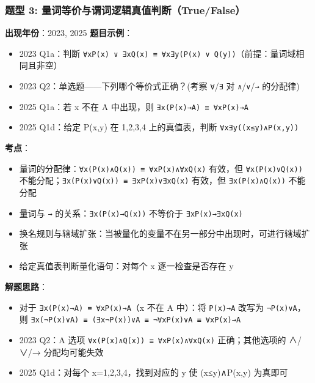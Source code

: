 \documentclass[10pt,a4paper,openany]{ctexbook}
\theoremstyle{definition}
\theoremstyle{remark}
\begin{document}
\vspace{-2pt}

\subsubsection{题型 3: 量词等价与谓词逻辑真值判断（True/False）}

\textbf{出现年份}：2023, 2025
\textbf{题目示例}：
\begin{itemize}
\item 2023 Q1a：判断 \texttt{∀xP(x) ∨ ∃xQ(x) ≡ ∀x∃y(P(x) ∨ Q(y))}（前提：量词域相同且非空）
\item 2023 Q2：单选题——下列哪个等价式正确？(考察 \texttt{∀}/\texttt{∃} 对 \texttt{∧}/\texttt{∨}/\texttt{→} 的分配律)
\item 2025 Q1a：若 x 不在 A 中出现，则 \texttt{∃x(P(x)→A) ≡ ∀xP(x)→A}
\item 2025 Q1d：给定 P(x,y) 在 {1,2,3,4} 上的真值表，判断 \texttt{∀x∃y((x≤y)∧P(x,y))}

\end{itemize}

\textbf{考点}：
\begin{itemize}
\item 量词的分配律：\texttt{∀x(P(x)∧Q(x)) ≡ ∀xP(x)∧∀xQ(x)} 有效，但 \texttt{∀x(P(x)∨Q(x))} 不能分配；\texttt{∃x(P(x)∨Q(x)) ≡ ∃xP(x)∨∃xQ(x)} 有效，但 \texttt{∃x(P(x)∧Q(x))} 不能分配
\item 量词与 \texttt{→} 的关系：\texttt{∃x(P(x)→Q(x))} 不等价于 \texttt{∃xP(x)→∃xQ(x)}
\item 换名规则与辖域扩张：当被量化的变量不在另一部分中出现时，可进行辖域扩张
\item 给定真值表判断量化语句：对每个 x 逐一检查是否存在 y

\end{itemize}

\textbf{解题思路}：
\begin{itemize}
\item 对于 \texttt{∃x(P(x)→A) ≡ ∀xP(x)→A}（x 不在 A 中）：将 \texttt{P(x)→A} 改写为 \texttt{¬P(x)∨A}，则 \texttt{∃x(¬P(x)∨A) ≡ (∃x¬P(x))∨A ≡ ¬∀xP(x)∨A ≡ ∀xP(x)→A}
\item 2023 Q2：A 选项 \texttt{∀x(P(x)∧Q(x)) ≡ ∀xP(x)∧∀xQ(x)} 正确；其他选项的 ∧/∨/→ 分配均可能失效
\item 2025 Q1d：对每个 x=1,2,3,4，找到对应的 y 使 (x≤y)∧P(x,y) 为真即可

\end{itemize}

\vspace{-2pt}
\end{document}

